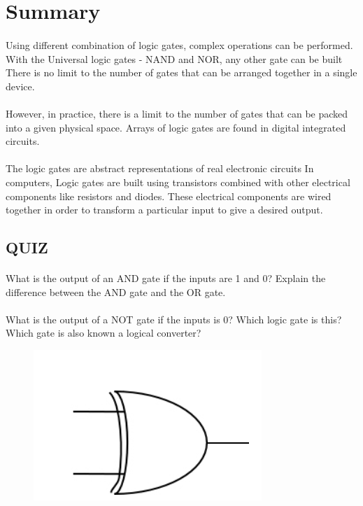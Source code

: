 \documentclass{article}
\begin{document}
\section{Summary}
\paragraph{}
Using different combination of logic gates, complex operations can be performed. 
With the Universal logic gates - NAND and NOR, any other gate can be built
There is no limit to the number of gates that can be arranged together in a single device.
\paragraph{}
However, in practice, there is a limit to the number of gates that can be packed into a given physical space. 
Arrays of logic gates are found in digital integrated circuits.
\paragraph{}
The logic gates are abstract representations of real electronic circuits
In computers, Logic gates are built using transistors combined with other electrical components like resistors and diodes. 
These electrical components are wired together in order to transform a particular input to give a desired output.

\newpage
\begin{center}
	\section{\textbf{QUIZ}}
\end{center}
\paragraph{}
What is the output of an AND gate if the inputs are 1 and 0?
Explain the difference between the AND gate and the OR gate.
\paragraph{}
What is the output of a NOT gate if the inputs is 0?
Which logic gate is this?
Which gate is also known 
a logical converter?
\begin{figure}[h!]
	\includegraphics[width=.6\textwidth,left]{quiz}
\end{figure}
\end{document}
